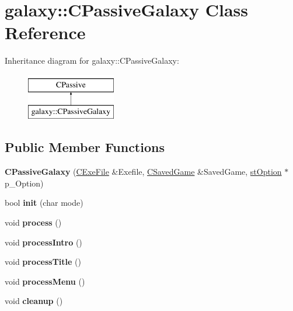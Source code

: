 \hypertarget{classgalaxy_1_1_c_passive_galaxy}{
\section{galaxy::CPassiveGalaxy Class Reference}
\label{classgalaxy_1_1_c_passive_galaxy}
}
Inheritance diagram for galaxy::CPassiveGalaxy:\begin{figure}[H]
\begin{center}
\leavevmode
\includegraphics[height=2cm]{classgalaxy_1_1_c_passive_galaxy}
\end{center}
\end{figure}
\subsection*{Public Member Functions}
\begin{DoxyCompactItemize}
\item 
\hypertarget{classgalaxy_1_1_c_passive_galaxy_a94e4113fb961845ea977b27f0c0087b0}{
{\bfseries CPassiveGalaxy} (\hyperlink{class_c_exe_file}{CExeFile} \&Exefile, \hyperlink{class_c_saved_game}{CSavedGame} \&SavedGame, \hyperlink{structst_option}{stOption} $\ast$p\_\-Option)}
\label{classgalaxy_1_1_c_passive_galaxy_a94e4113fb961845ea977b27f0c0087b0}

\item 
\hypertarget{classgalaxy_1_1_c_passive_galaxy_aa6b7c9a51114463812cfe5f2162c63e7}{
bool {\bfseries init} (char mode)}
\label{classgalaxy_1_1_c_passive_galaxy_aa6b7c9a51114463812cfe5f2162c63e7}

\item 
\hypertarget{classgalaxy_1_1_c_passive_galaxy_a6939a1ffb49e5f9e0318633d25ed5fb7}{
void {\bfseries process} ()}
\label{classgalaxy_1_1_c_passive_galaxy_a6939a1ffb49e5f9e0318633d25ed5fb7}

\item 
\hypertarget{classgalaxy_1_1_c_passive_galaxy_a0971032b6e63cb2797a57ac89346dc22}{
void {\bfseries processIntro} ()}
\label{classgalaxy_1_1_c_passive_galaxy_a0971032b6e63cb2797a57ac89346dc22}

\item 
\hypertarget{classgalaxy_1_1_c_passive_galaxy_a83fbf5bac70c47fd5d6ad9948998cb8f}{
void {\bfseries processTitle} ()}
\label{classgalaxy_1_1_c_passive_galaxy_a83fbf5bac70c47fd5d6ad9948998cb8f}

\item 
\hypertarget{classgalaxy_1_1_c_passive_galaxy_a1966ac148df900fa1ab0eeb8d840ed89}{
void {\bfseries processMenu} ()}
\label{classgalaxy_1_1_c_passive_galaxy_a1966ac148df900fa1ab0eeb8d840ed89}

\item 
\hypertarget{classgalaxy_1_1_c_passive_galaxy_a91b9e58f526d6999197c594e58baa7cd}{
void {\bfseries cleanup} ()}
\label{classgalaxy_1_1_c_passive_galaxy_a91b9e58f526d6999197c594e58baa7cd}

\end{DoxyCompactItemize}
